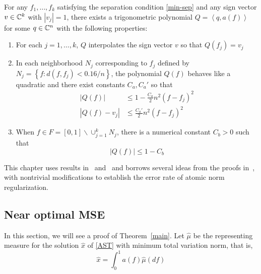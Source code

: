 \begin{theorem}
\label{dual-stab} For any $f_1, \ldots, f_k$ satisfying the separation condition \eqref{min-sep} and any sign vector $v \in \mathbb{C}^k$ with $|v_j|=1$, there exists a trigonometric polynomial $Q = \left<q, a(f)\right>$ for some $q \in \mathbb{C}^n$ with the following properties: 
\begin{enumerate}
\item For each $j = 1, \ldots, k$, $Q$ interpolates the sign vector $v$ so that $Q(f_j) = v_j$
\item In each neighborhood $N_j$ corresponding to $f_j$ defined by
$N_j = \left\{ f : d(f, f_j) < {0.16}/{n} \right\}$, 
the polynomial $Q(f)$ behaves like a quadratic and there exist constants $C_a, C_a'$ so that
\begin{align}
\label{q1}|Q(f)| & \leq 1 - \frac{C_a}{2} n^2 (f-f_j)^2\\
\label{q2}|Q(f) - v_j| & \leq \frac{C_a'}{2} n^2 (f - f_j)^2
\end{align}
\item When $f \in F = [0,1] \backslash \cup_{j=1}^k{N_j}$, there is a numerical constant $C_b>0$ such that
\[
|Q(f)| \leq 1 - C_b
\]
\end{enumerate}
\end{theorem}

This chapter uses results in~\cite{cg_noisy} and~\cite{btr12} and borrows
several ideas from the proofs in~\cite{cg_noisy}, with nontrivial modifications
to establish the error rate of atomic norm regularization.

\subsection{Near optimal MSE}

In this section, we will see a proof of Theorem~\ref{main}. Let $\hat{\mu}$ be
the representing measure for the solution $\hat{x}$ of \eqref{AST} with minimum
total variation norm, that is,
\[
\hat{x} = \int_0^1 a(f) \hat{\mu}(df)
\]

